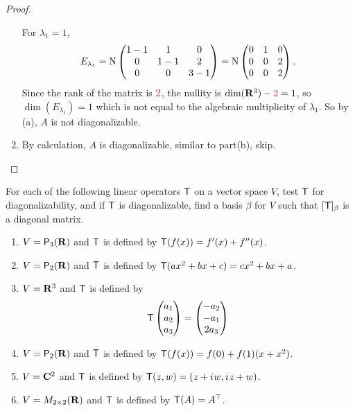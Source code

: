 \begin{proof}
\begin{enumerate}
For \(\lambda_1 = 1\),
\[
    E_{\lambda_1} = \mathrm{N} \begin{pmatrix} 1-1 & 1 & 0 \\ 0 & 1-1 & 2 \\ 0 & 0 & 3-1 \end{pmatrix} = \mathrm{N} \begin{pmatrix} 0 & 1 & 0 \\ 0 & 0 & 2 \\ 0 & 0 & 2 \end{pmatrix}.
\]
Since the rank of the matrix is \(\RED{2}\), the nullity is \(\dim(\SET{R}^3) - \RED{2} = 1\), so \(\dim(E_{\lambda_1}) = 1\) which is not equal to the algebraic multiplicity of \(\lambda_1\).
So by (a), \(A\) is not diagonalizable.

\item By calculation, \(A\) is diagonalizable, similar to part(b), skip.
\end{enumerate}
\end{proof}

\begin{exercise} \label{exercise 5.2.3}
For each of the following linear operators \(\textsf{T}\) on a vector space \(V\), test \(\textsf{T}\) for diagonalizability, and if \(\textsf{T}\) is diagonalizable, find a basis \(\beta\) for \(V\) such that \([\textsf{T}]_{\beta}\) is a diagonal matrix.

\begin{enumerate}
\item \(V = \textsf{P}_3(\mathbf{R})\) and \(\textsf{T}\) is defined by \(\textsf{T}(f(x)) = f'(x) + f''(x)\).
\item \(V = \textsf{P}_2(\mathbf{R})\) and \(\textsf{T}\) is defined by \(\textsf{T}(ax^2 + bx + c) = cx^2 + bx + a\).
\item \(V = \mathbf{R}^3\) and \(\textsf{T}\) is defined by
\[
    \textsf{T} \begin{pmatrix} a_1 \\ a_2 \\ a_3 \end{pmatrix}
    = \begin{pmatrix} -a_2 \\ -a_1 \\ 2a_3 \end{pmatrix}
\]
\item \(V = \textsf{P}_2(\mathbf{R})\) and \(\textsf{T}\) is defined by \(\textsf{T}(f(x)) = f(0) + f(1)(x + x^2)\).
\item \(V = \mathbf{C}^2\) and \(\textsf{T}\) is defined by \(\textsf{T}(z, w) = (z + {i\mkern1mu} w, {i\mkern1mu} z + w)\).
\item \(V = M_{2 \times 2}(\mathbf{R})\) and \(\textsf{T}\) is defined by \(\textsf{T}(A) = A^\top\).
\end{enumerate}
\end{exercise}

